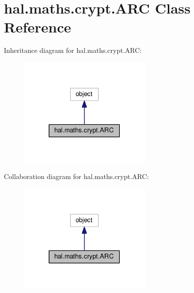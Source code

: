 \hypertarget{classhal_1_1maths_1_1crypt_1_1_a_r_c}{}\section{hal.\+maths.\+crypt.\+A\+RC Class Reference}
\label{classhal_1_1maths_1_1crypt_1_1_a_r_c}


Inheritance diagram for hal.\+maths.\+crypt.\+A\+RC\+:\nopagebreak
\begin{figure}[H]
\begin{center}
\leavevmode
\includegraphics[width=189pt]{classhal_1_1maths_1_1crypt_1_1_a_r_c__inherit__graph}
\end{center}
\end{figure}


Collaboration diagram for hal.\+maths.\+crypt.\+A\+RC\+:\nopagebreak
\begin{figure}[H]
\begin{center}
\leavevmode
\includegraphics[width=189pt]{classhal_1_1maths_1_1crypt_1_1_a_r_c__coll__graph}
\end{center}
\end{figure}
